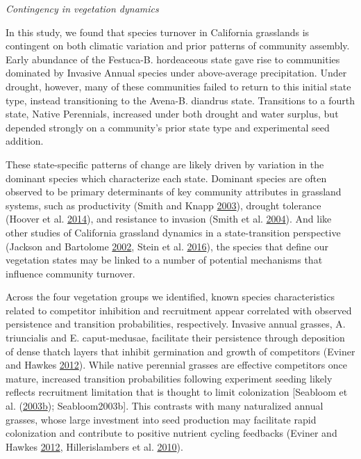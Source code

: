 \documentclass[twoside,12pt,final]{ucthesis-CA2012}
\begin{document}
\begin{ucmainmatter}
\emph{Contingency in vegetation dynamics}

In this study, we found that species turnover in California grasslands is contingent on both climatic variation and prior patterns of community assembly.
Early abundance of the Festuca-B. hordeaceous state gave rise to communities dominated by Invasive Annual species under above-average precipitation.
Under drought, however, many of these communities failed to return to this initial state type, instead transitioning to the Avena-B. diandrus state.
Transitions to a fourth state, Native Perennials, increased under both drought and water surplus, but depended strongly on a community's prior state type and experimental seed addition.

These state-specific patterns of change are likely driven by variation in the dominant species which characterize each state.
Dominant species are often observed to be primary determinants of key community attributes in grassland systems, such as productivity (Smith and Knapp \protect\hyperlink{ref-Smith2003}{2003}), drought tolerance (Hoover et al. \protect\hyperlink{ref-Hoover2014}{2014}), and resistance to invasion (Smith et al. \protect\hyperlink{ref-Smith2004}{2004}).
And like other studies of California grassland dynamics in a state-transition perspective (Jackson and Bartolome \protect\hyperlink{ref-Jackson2002}{2002}, Stein et al. \protect\hyperlink{ref-Stein2016}{2016}), the species that define our vegetation states may be linked to a number of potential mechanisms that influence community turnover.

Across the four vegetation groups we identified, known species characteristics related to competitor inhibition and recruitment appear correlated with observed persistence and transition probabilities, respectively.
Invasive annual grasses, A. triuncialis and E. caput-medusae, facilitate their persistence through deposition of dense thatch layers that inhibit germination and growth of competitors (Eviner and Hawkes \protect\hyperlink{ref-Eviner2012}{2012}).
While native perennial grasses are effective competitors once mature, increased transition probabilities following experiment seeding likely reflects recruitment limitation that is thought to limit colonization {[}Seabloom et al. (\protect\hyperlink{ref-Seabloom2003a}{2003}\protect\hyperlink{ref-Seabloom2003a}{b}); Seabloom2003b{]}.
This contrasts with many naturalized annual grasses, whose large investment into seed production may facilitate rapid colonization and contribute to positive nutrient cycling feedbacks (Eviner and Hawkes \protect\hyperlink{ref-Eviner2012}{2012}, Hillerislambers et al. \protect\hyperlink{ref-Hillerislambers2010}{2010}).


\end{ucmainmatter}
\end{document}
